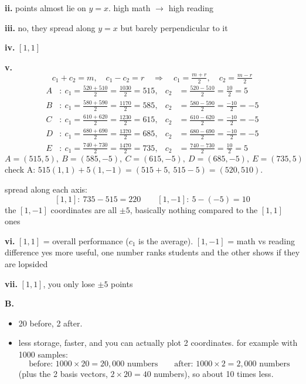 \documentclass{article}
\begin{document}
\textbf{ii.} points almost lie on $y = x$. high math $\to$ high reading

\textbf{iii.} no, they spread along $y=x$ but barely perpendicular to it

\textbf{iv.} $[1,1]$

\textbf{v.}
\[
c_1 + c_2 = m,\quad c_1 - c_2 = r
\quad\Rightarrow\quad
c_1 = \tfrac{m + r}{2},\quad c_2 = \tfrac{m - r}{2}
\]
\[
\begin{aligned}
A&:\ c_1 = \tfrac{520 + 510}{2} = \tfrac{1030}{2} = 515, & c_2 &= \tfrac{520 - 510}{2} = \tfrac{10}{2} = 5 \\
B&:\ c_1 = \tfrac{580 + 590}{2} = \tfrac{1170}{2} = 585, & c_2 &= \tfrac{580 - 590}{2} = \tfrac{-10}{2} = -5 \\
C&:\ c_1 = \tfrac{610 + 620}{2} = \tfrac{1230}{2} = 615, & c_2 &= \tfrac{610 - 620}{2} = \tfrac{-10}{2} = -5 \\
D&:\ c_1 = \tfrac{680 + 690}{2} = \tfrac{1370}{2} = 685, & c_2 &= \tfrac{680 - 690}{2} = \tfrac{-10}{2} = -5 \\
E&:\ c_1 = \tfrac{740 + 730}{2} = \tfrac{1470}{2} = 735, & c_2 &= \tfrac{740 - 730}{2} = \tfrac{10}{2} = 5
\end{aligned}
\]
\[
\boxed{A = (515, 5),\ B = (585, -5),\ C = (615, -5),\ D = (685, -5),\ E = (735, 5)}
\]
check A: $515(1,1) + 5(1,-1) = (515 + 5,\ 515 - 5) = (520,510)$. \checkmark

spread along each axis:
\[
[1,1]:\ 735 - 515 = 220 \qquad [1,-1]:\ 5 - (-5) = 10
\]
the $[1,-1]$ coordinates are all $\pm 5$, basically nothing compared to the $[1,1]$ ones

\textbf{vi.} $[1,1]$ = overall performance ($c_1$ is the average). $[1,-1]$ = math vs reading difference
yes more useful, one number ranks students and the other shows if they are lopsided

\textbf{vii.} $[1,1]$, you only lose $\pm5$ points

\textbf{B.}
\begin{itemize}
  \item[i.] 20 before, 2 after.
  \item[ii.] less storage, faster, and you can actually plot 2 coordinates. for example with 1000 samples:
  \[
  \text{before: } 1000 \times 20 = 20{,}000 \text{ numbers}
  \qquad
  \text{after: } 1000 \times 2 = 2{,}000 \text{ numbers}
  \]
  (plus the 2 basis vectors, $2 \times 20 = 40$ numbers), so about 10 times less.
\end{itemize}
\end{document}
